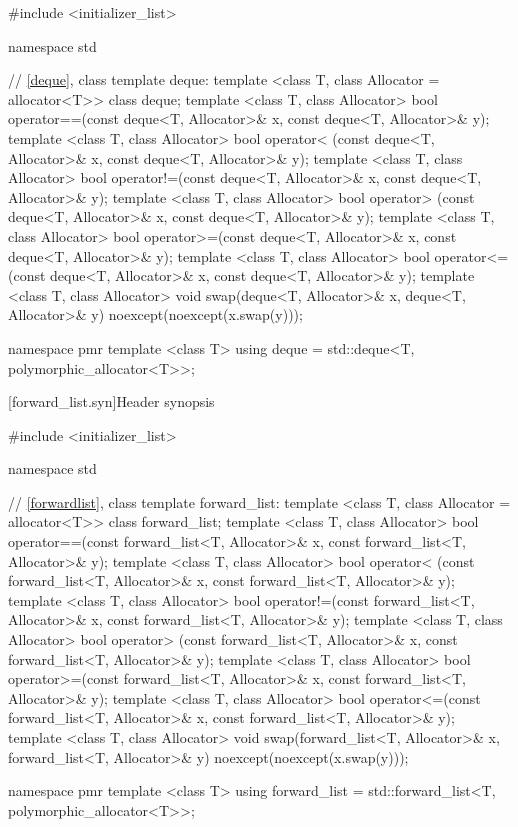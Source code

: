 \begin{codeblock}
#include <initializer_list>

namespace std {
  // \ref{deque}, class template deque:
  template <class T, class Allocator = allocator<T>> class deque;
  template <class T, class Allocator>
    bool operator==(const deque<T, Allocator>& x, const deque<T, Allocator>& y);
  template <class T, class Allocator>
    bool operator< (const deque<T, Allocator>& x, const deque<T, Allocator>& y);
  template <class T, class Allocator>
    bool operator!=(const deque<T, Allocator>& x, const deque<T, Allocator>& y);
  template <class T, class Allocator>
    bool operator> (const deque<T, Allocator>& x, const deque<T, Allocator>& y);
  template <class T, class Allocator>
    bool operator>=(const deque<T, Allocator>& x, const deque<T, Allocator>& y);
  template <class T, class Allocator>
    bool operator<=(const deque<T, Allocator>& x, const deque<T, Allocator>& y);
  template <class T, class Allocator>
    void swap(deque<T, Allocator>& x, deque<T, Allocator>& y)
      noexcept(noexcept(x.swap(y)));

  namespace pmr {
    template <class T>
      using deque = std::deque<T, polymorphic_allocator<T>>;
  }
}
\end{codeblock}

[forward_list.syn]{Header  synopsis}


\begin{codeblock}
#include <initializer_list>

namespace std {
  // \ref{forwardlist}, class template forward_list:
  template <class T, class Allocator = allocator<T>> class forward_list;
  template <class T, class Allocator>
    bool operator==(const forward_list<T, Allocator>& x, const forward_list<T, Allocator>& y);
  template <class T, class Allocator>
    bool operator< (const forward_list<T, Allocator>& x, const forward_list<T, Allocator>& y);
  template <class T, class Allocator>
    bool operator!=(const forward_list<T, Allocator>& x, const forward_list<T, Allocator>& y);
  template <class T, class Allocator>
    bool operator> (const forward_list<T, Allocator>& x, const forward_list<T, Allocator>& y);
  template <class T, class Allocator>
    bool operator>=(const forward_list<T, Allocator>& x, const forward_list<T, Allocator>& y);
  template <class T, class Allocator>
    bool operator<=(const forward_list<T, Allocator>& x, const forward_list<T, Allocator>& y);
  template <class T, class Allocator>
    void swap(forward_list<T, Allocator>& x, forward_list<T, Allocator>& y)
      noexcept(noexcept(x.swap(y)));

  namespace pmr {
    template <class T>
      using forward_list = std::forward_list<T, polymorphic_allocator<T>>;
  }
}
\end{codeblock}

